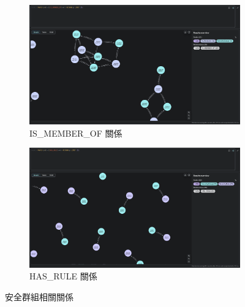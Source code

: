 \documentclass[11pt,a4paper]{ctexart}
\begin{document}
\begin{figure}[H]
\centering
\begin{subfigure}[b]{0.48\textwidth}
\centering
\includegraphics[width=\textwidth]{IS_MEMBER_OF.png}
\caption{IS\_MEMBER\_OF 關係}
\label{fig:is_member_of}
\end{subfigure}
\hfill
\begin{subfigure}[b]{0.48\textwidth}
\centering
\includegraphics[width=\textwidth]{HAS_RULE.png}
\caption{HAS\_RULE 關係}
\label{fig:has_rule}
\end{subfigure}
\caption{安全群組相關關係}
\label{fig:security_relationships}
\end{figure}
\end{document}
